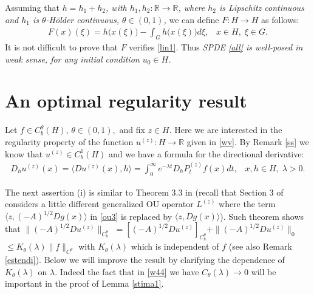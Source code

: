 \documentclass[preprint]{imsart}
\def\R{\mathbb R}
\begin{document}
Assuming that {\sl $h = h_1 + h_2$, with $h_1, h_2  : \R \to \R$,  where $h_2$ is Lipschitz continuous and $h_1$ is $\theta$-H\"older continuous, $\theta \in (0,1)$,
}
we can define $F : H \to H$ as follows:
$$
\begin{array}{l} 
F(x)(\xi) = {   h( }x(\xi)) - \int_G  {   h( }x(\xi))d\xi,\;\;\; x \in H,\; \xi \in G.  
\end{array} 
$$
 It is not difficult to prove that  $F$ verifies \eqref{lin1}. Thus {\sl SPDE \eqref{all} is well-posed in weak sense, for any initial condition $u_0 \in H$.  
 }
 
 \section {An   optimal  regularity result  }    
 
 
Let $f \in C_b^{\theta}(H)$, $\theta \in (0,1),$ and fix $z \in H$. Here we are interested in the regularity property of the function $u^{(z)}: H \to \R$ given in \eqref{wv}. 
  By Remark \ref{ss} we know that  $u^{(z)} \in C^1_b(H)$ and we have a formula for the directional derivative:  
\begin{gather} \label{s55} 
  D_h u^{(z)}(x) = \langle Du^{(z)}(x), h \rangle = \int_0^{\infty} e^{- \lambda t}  D_{ h} P_t^{(z)} f(x) dt,\;\;\; x,h \in H, \; \lambda >0. 
\end{gather}

 The next assertion (i)    is similar to  Theorem 3.3 in \cite{D2}
  (recall that 
 Section 3 of \cite{D2}  considers a little different generalized OU operator 
 $L^{(z)} $  where the term $\langle z , (-A)^{1/2} Dg (x)\rangle$ in  
  \eqref{ou3} is replaced by $\langle z , Dg (x)\rangle$). Such theorem  shows    that 
  $\| (-A)^{1/2} Du^{(z)} \|_{C_b^{\theta}} $ $= [ (-A)^{1/2} Du^{(z)} ]_{C_b^{\theta}} 
 + \| (-A)^{1/2} Du^{(z)} \|_{0}  $ $\le K_{\theta}(\lambda) \|f\|_{C^{\theta}}$ with
 $K_{\theta}(\lambda)$ which is independent 
  of $f$ (see also Remark \ref{estendi}). Below we will improve the result
 by clarifying the dependence of  $K_{\theta}(\lambda)$ on $\lambda$.
   Indeed  the fact that in \eqref{w44} we have $C_{\theta}(\lambda) \to 0$ will be important in the proof of Lemma \ref{stima1}.
  
\end{document}
